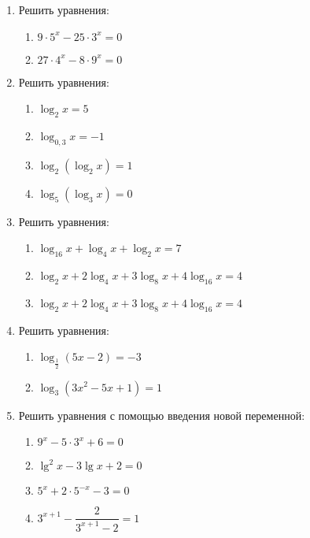 \documentclass[12pt, a4paper]{article}
\begin{document}
\begin{enumerate}
	\item Решить уравнения:
	\begin{multicols}{2}
		\begin{enumerate}[label=\textbf{\arabic*)}]
			\item $9\cdot5^x-25\cdot3^x=0$
			\item $27\cdot4^x-8\cdot9^x=0$
		\end{enumerate}
	\end{multicols}
	\item Решить уравнения:
	\begin{multicols}{2}
		\begin{enumerate}[label=\textbf{\arabic*)}]
			\item $\log_2 x = 5$
			\item $\log_{0,3} x = -1$
			\item $\log_2 (\log_2 x) = 1$
			\item $\log_5 (\log_3 x) = 0$
		\end{enumerate}
	\end{multicols}
	\item Решить уравнения:
	\begin{multicols}{2}
		\begin{enumerate}[label=\textbf{\arabic*)}]
			\item $\log_{16} x + \log_4 x + \log_2 x = 7$
			\item $\log_2 x + 2\log_4 x + 3\log_8 x + 4\log_16 x = 4$
			\item $\log_2 x + 2\log_4 x + 3\log_8 x + 4\log_16 x = 4$
		\end{enumerate}
	\end{multicols}
	\item Решить уравнения:
	\begin{multicols}{2}
		\begin{enumerate}[label=\textbf{\arabic*)}]
			\item $\log_{\frac{1}{2}} (5x-2) = -3$
			\item $\log_3 (3x^2-5x+1) = 1$
		\end{enumerate}
	\end{multicols}
	\item Решить уравнения с помощью введения новой переменной:
	\begin{multicols}{2}
		\begin{enumerate}[label=\textbf{\arabic*)}]
			\item $9^x-5\cdot3^x+6=0$
			\item $\lg^2 x - 3\lg x + 2 = 0$
			\item $5^x+2\cdot5^{-x}-3=0$
			\item $3^{x+1}-\dfrac{2}{3^{x+1}-2}=1$
		\end{enumerate}
	\end{multicols}
\end{enumerate}
\end{document}
